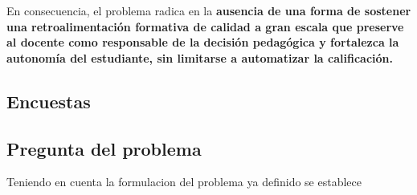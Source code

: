 \documentclass[letterpaper, 10 pt, conference]{ieeeconf}  %
\begin{document}
    En consecuencia, el problema radica en la \textbf{ausencia de una forma de sostener una retroalimentación formativa de calidad a gran escala que preserve al docente como responsable de la decisión pedagógica y fortalezca la autonomía del estudiante, sin limitarse a automatizar la calificación.}


    \subsection{Encuestas}
    


    
    \subsection{Pregunta del problema}
    Teniendo en cuenta la formulacion del problema ya definido se establece 

    


\addtolength{\textheight}{-12cm}   %










\end{document}
